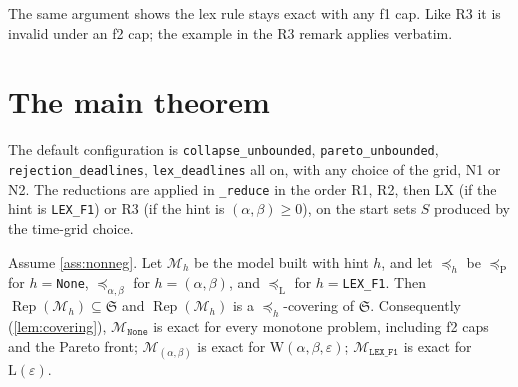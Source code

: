 \documentclass[11pt,a4paper]{article}
\newcommand{\Sched}{\mathfrak{S}}
\newcommand{\Rep}{\operatorname{Rep}}
\newcommand{\code}[1]{\texttt{#1}}
\newcommand{\preceqP}{\preceq_{\mathrm{P}}}
\newcommand{\preceqW}{\preceq_{\alpha,\beta}}
\newcommand{\preceqL}{\preceq_{\mathrm{L}}}
\begin{document}
The same argument shows the lex rule stays exact with any f1 cap. Like R3 it
is invalid under an f2 cap; the example in the R3 remark applies verbatim.

\section{The main theorem}\label{sec:main}

The default configuration is \code{collapse\_unbounded}, \code{pareto\_unbounded},
\code{rejection\_deadlines}, \code{lex\_deadlines} all on, with any choice of
the grid, N1 or N2. The reductions are applied in \code{\_reduce} in the
order R1, R2, then LX (if the hint is \code{LEX\_F1}) or R3 (if the hint is
$(\alpha,\beta)\ge0$), on the start sets $S$ produced by the time-grid choice.

\begin{theorem}\label{thm:main}
Assume \cref{ass:nonneg}. Let $\mathcal M_h$ be the model built with hint
$h$, and let $\preceq_h$ be $\preceqP$ for $h=$\code{None}, $\preceqW$ for
$h=(\alpha,\beta)$, and $\preceqL$ for $h=$\code{LEX\_F1}. Then
$\Rep(\mathcal M_h)\subseteq\Sched$ and $\Rep(\mathcal M_h)$ is a
$\preceq_h$-covering of $\Sched$. Consequently (\cref{lem:covering}),
$\mathcal M_{\texttt{None}}$ is exact for every monotone problem, including
f2 caps and the Pareto front; $\mathcal M_{(\alpha,\beta)}$ is exact for
$\mathrm W(\alpha,\beta,\varepsilon)$; $\mathcal M_{\texttt{LEX\_F1}}$ is
exact for $\mathrm L(\varepsilon)$.
\end{theorem}
\end{document}
